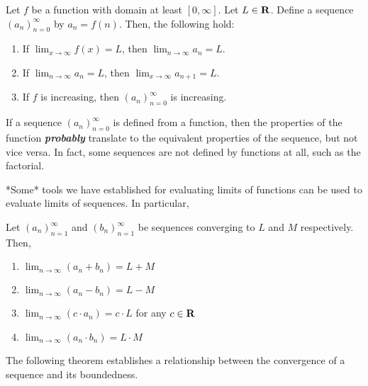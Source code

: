 \documentclass{article}
\begin{document}
    \begin{thm}
      Let \(f\) be a function with domain at least \([0, \infty]\). Let \(L \in \mathbf{R}\). Define a sequence \((a_n)_{n=0}^{\infty}\) by \(a_n = f(n)\). Then, the following hold:

      \begin{enumerate}
        \item If \(\lim_{x \to \infty}f(x) = L\), then \(\lim_{n \to \infty}a_n = L\).
        \item If \(\lim_{n \to \infty}a_n = L\), then \(\lim_{x \to \infty}a_{n+1} = L\).
        \item If \(f\) is increasing, then \((a_n)_{n=0}^{\infty}\) is increasing.
      \end{enumerate}
    \end{thm}

    \begin{note}
      If a sequence \((a_n)_{n=0}^{\infty}\) is defined from a function, then the properties of the function \textbf{\emph{probably}} translate to the equivalent properties of the sequence, but not vice versa. In fact, some sequences are not defined by functions at all, such as the factorial.
      \end{note}

    *Some* tools we have established for evaluating limits of functions can be used to evaluate limits of sequences. In particular,

    \begin{thm}
      \everymath{\displaystyle}
      Let \((a_n)_{n=1}^{\infty}\) and \((b_n)_{n=1}^{\infty}\) be sequences converging to \(L\) and \(M\) respectively. Then,
      \begin{enumerate}
        \item \(\lim_{n \to \infty}(a_n + b_n) = L + M\)
        \item \(\lim_{n \to \infty}(a_n - b_n) = L - M\)
        \item \(\lim_{n \to \infty}(c \cdot a_n) = c \cdot L\) for any \(c \in \mathbf{R}\)
        \item \(\lim_{n \to \infty}(a_n \cdot b_n) = L \cdot M\)

      \end{enumerate}
    \end{thm}

    The following theorem establishes a relationship between the convergence of a sequence and its boundedness.
    
\end{document}
